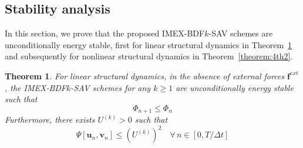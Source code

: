 \documentclass[review]{elsarticle}
\newtheorem{theorem}{Theorem}[section]
\begin{document}
\subsection{Stability analysis}
\label{subsec:4th22}
In this section, we prove that the proposed IMEX-BDF$k$-SAV schemes are unconditionally energy stable, first for linear structural dynamics in Theorem~\ref{theorem:4th1} and subsequently for nonlinear structural dynamics in Theorem~\ref{theorem:4th2}. 
\begin{theorem}
    \label{theorem:4th1}
  For linear structural dynamics, in the absence of external forces $\boldsymbol{f}^{ext}$, the IMEX-BDF$k$-SAV schemes for any $k \ge 1$ are unconditionally energy stable such that
  \begin{equation}
      \Phi_{n+1} \le \Phi_n \label{eqn:4thLTheorem1}
  \end{equation}
  Furthermore, there exists $U^{(k)}>0$ such that
  \begin{equation}
      \Psi[\boldsymbol{u}_n,\boldsymbol{v}_n] \le \left(U^{(k)}\right)^2 \quad  \forall \, n \in [0, T/\Delta t] \label{eqn:4thLTheorem2}
  \end{equation}
\end{theorem}
\end{document}

